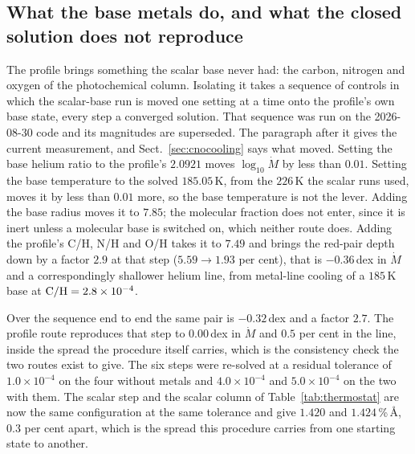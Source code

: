 \documentclass[english,a4paper]{my_memo}
\begin{document}
\subsection{What the base metals do, and what the closed solution does not
reproduce}
\label{sec:basemetals}

The profile brings something the scalar base never had: the carbon, nitrogen
and oxygen of the photochemical column. Isolating it takes a sequence of
controls in which the scalar-base run is moved one setting at a time onto the
profile's own base state, every step a converged solution. That sequence was
run on the 2026-08-30 code and its magnitudes are superseded. The paragraph
after it gives the current measurement, and Sect.~\ref{sec:cnocooling} says
what moved. Setting the base helium ratio to the profile's $2.0921$ moves
$\log_{10}\dot M$ by less than $0.01$. Setting the base temperature to the
solved $185.05$\,K, from the $226$\,K the scalar runs used, moves it by less
than $0.01$ more, so the base temperature is not the lever. Adding the base
radius moves it to $7.85$; the molecular fraction does not enter, since it is
inert unless a molecular base is switched on, which neither route does.
Adding the profile's C/H, N/H and O/H takes it to $\mathbf{7.49}$ and brings
the red-pair depth down by a factor $\mathbf{2.9}$ at that step
($5.59 \rightarrow 1.93$ per cent), that is $-0.36$\,dex in $\dot M$ and a
correspondingly shallower helium line, from metal-line cooling of a $185$\,K
base at ${\rm C/H} = 2.8\times10^{-4}$.

Over the sequence end to end the same pair is $-0.32$\,dex and a factor
$2.7$. The profile route reproduces that step to $0.00$\,dex in $\dot M$ and
$0.5$ per cent in the line, inside the spread the procedure itself carries,
which is the consistency check the two routes exist to give. The six steps
were re-solved at a residual tolerance of $1.0\times10^{-4}$ on the four
without metals and $4.0\times10^{-4}$ and $5.0\times10^{-4}$ on the two with
them. The scalar step and the scalar column of Table~\ref{tab:thermostat} are
now the same configuration at the same tolerance and give $1.420$ and
$1.424$\,\%\,\AA, $0.3$ per cent apart, which is the spread this procedure
carries from one starting state to another.
\end{document}
